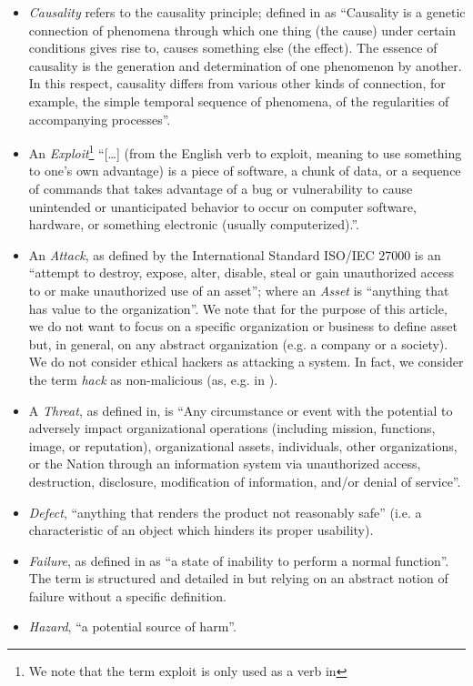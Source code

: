 \begin{itemize}
	\item \emph{Causality} refers to the causality principle; defined
		in\autocite{Spirkin1983Dialectical} as ``Causality is a genetic
		connection of phenomena through which one thing (the cause)
		under certain conditions gives rise to, causes something else
		(the effect). The essence of causality is the generation and
		determination of one phenomenon by another. In this respect,
		causality differs from various other kinds of connection, for
		example, the simple temporal sequence of phenomena, of the
		regularities of accompanying processes''.
	\item An \emph{Exploit}\footnote{We note that the term exploit is only
		used as a verb in\autocite{ISO2009information}} ``[\ldots]
		(from the English verb to exploit, meaning to use something to
		one’s own advantage) is a piece of software, a chunk of data,
		or a sequence of commands that takes advantage of a bug or
		vulnerability to cause unintended or unanticipated behavior to
		occur on computer software, hardware, or something electronic
		(usually computerized).''\autocite{wiki-exploit}.
	\item An \emph{Attack}, as defined by the International Standard
		ISO/IEC 27000 is an ``attempt to destroy, expose, alter,
		disable, steal or gain unauthorized access to or make
		unauthorized use of an asset''; where an \emph{Asset} is
		``anything that has value to the organization''. We note that for
		the purpose of this article, we do not want to focus on a specific
		organization or business to define asset but, in general, on any 
		abstract organization (e.g. a company or a society).
		We do not consider ethical hackers as attacking a system. 
		In fact, we consider the term \emph{hack} as
		non-malicious (as, e.g. in \autocite{Stallman2002hacker}).
	\item A \emph{Threat}, as defined in\autocite{cnssi20104009}, is ``Any
		circumstance or event with the potential to adversely impact
		organizational operations (including mission, functions, image,
		or reputation), organizational assets, individuals, other
		organizations, or the Nation through an information system via
		unauthorized access, destruction, disclosure, modification of
		information, and/or denial of service''.
	\item \emph{Defect}, ``anything that renders the product not reasonably
		safe''\autocite{Robinson2019writing} (i.e. a characteristic of
		an object which hinders its proper usability).
	\item \emph{Failure}, as defined in\autocite{Merriam2020failure} as ``a state of
		inability to perform a normal function''. The term is
		structured and detailed in
		\autocite{cnssi20104009,iet2017glossary} but relying on an
		abstract notion of failure without a specific definition.
	\item \emph{Hazard}, ``a potential source of
		harm''\autocite{iet2017glossary}.
\end{itemize}

